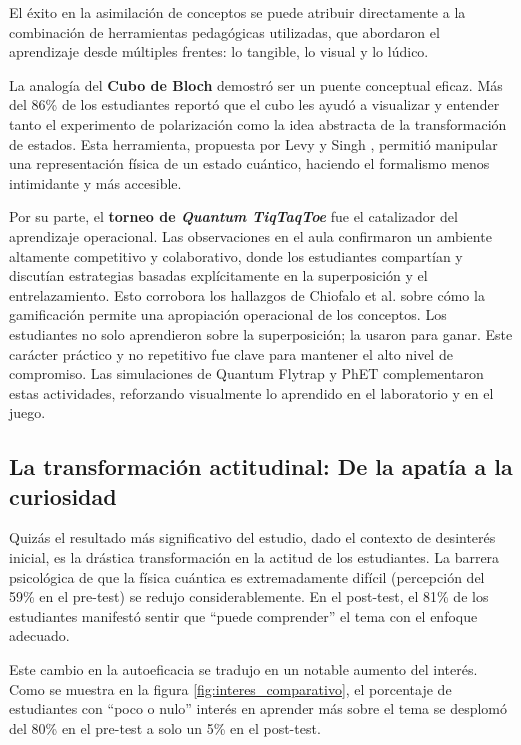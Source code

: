\documentclass[10pt,a4paper]{article}
\begin{document}
El éxito en la asimilación de conceptos se puede atribuir directamente a la combinación de herramientas pedagógicas utilizadas, que abordaron el aprendizaje desde múltiples frentes: lo tangible, lo visual y lo lúdico.

La analogía del \textbf{Cubo de Bloch} demostró ser un puente conceptual eficaz. Más del 86\% de los estudiantes reportó que el cubo les ayudó a visualizar y entender tanto el experimento de polarización como la idea abstracta de la transformación de estados. Esta herramienta, propuesta por Levy y Singh \cite{TeachingQuantumFormalism2024}, permitió manipular una representación física de un estado cuántico, haciendo el formalismo menos intimidante y más accesible.

Por su parte, el \textbf{torneo de \textit{Quantum TiqTaqToe}} fue el catalizador del aprendizaje operacional. Las observaciones en el aula confirmaron un ambiente altamente competitivo y colaborativo, donde los estudiantes compartían y discutían estrategias basadas explícitamente en la superposición y el entrelazamiento. Esto corrobora los hallazgos de Chiofalo et al. \cite{GamesForTeaching2022} sobre cómo la gamificación permite una apropiación operacional de los conceptos. Los estudiantes no solo aprendieron sobre la superposición; la usaron para ganar. Este carácter práctico y no repetitivo fue clave para mantener el alto nivel de compromiso. Las simulaciones de Quantum Flytrap \cite{VisualizingQuantumMechanics2022} y PhET complementaron estas actividades, reforzando visualmente lo aprendido en el laboratorio y en el juego.




\subsection{La transformación actitudinal: De la apatía a la curiosidad}

Quizás el resultado más significativo del estudio, dado el contexto de desinterés inicial, es la drástica transformación en la actitud de los estudiantes. La barrera psicológica de que la física cuántica es extremadamente difícil (percepción del 59\% en el pre-test) se redujo considerablemente. En el post-test, el 81\% de los estudiantes manifestó sentir que ``puede comprender'' el tema con el enfoque adecuado.

Este cambio en la autoeficacia se tradujo en un notable aumento del interés. Como se muestra en la figura \ref{fig:interes_comparativo}, el porcentaje de estudiantes con ``poco o nulo'' interés en aprender más sobre el tema se desplomó del 80\% en el pre-test a solo un 5\% en el post-test.
\end{document}
